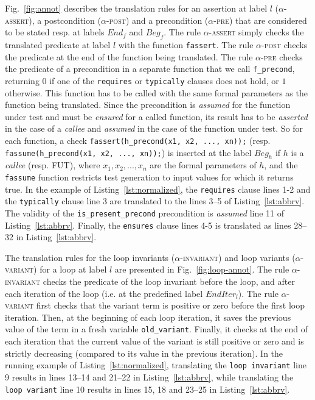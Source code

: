 Fig.~\ref{fig:annot} describes the translation rules for an assertion at label $l$
(\textsc{$\alpha$-assert}), a postcondition (\textsc{$\alpha$-post}) and
a precondition (\textsc{$\alpha$-pre})
that are considered to be stated resp. at labels $End_f$ and $Beg_f$. 
The rule \textsc{$\alpha$-assert}
simply checks the translated predicate at label $l$ with the function
\lstinline|fassert|. The rule \textsc{$\alpha$-post} checks the predicate at
the end of the function being translated. The rule \textsc{$\alpha$-pre} checks
the predicate of a precondition in a separate function that we call
\lstinline'f_precond', returning $0$ if one of the \lstinline|requires| or
\lstinline|typically| clauses does not hold, or $1$ otherwise. This function
has to be called with the same formal parameters as the function
being translated.
Since the precondition is \emph{assumed} for the function under test
and must be \emph{ensured} for a called function,
its result has to be {\em asserted} in the case
of a {\em callee}  and {\em assumed} in the case of the function under
test.
So for each function, a check 
\lstinline|fassert(h_precond(x1, x2, ..., xn));| (resp.
\lstinline|fassume(h_precond(x1, x2, ..., xn));|) is inserted at the label
$Beg_h$ if $h$ is a {\em callee} (resp. FUT), where
$x_1, x_2, ..., x_n$ are the formal parameters of $h$, and
the \lstinline|fassume| function restricts 
test generation to input values for which it returns true.
In the example of Listing~\ref{lst:normalized}, the
\lstinline|requires| clause lines 1-2 and the \lstinline|typically| clause line
3 are translated to the lines 3--5 of Listing~\ref{lst:abbrv}. The validity of the
\lstinline'is_present_precond' precondition is {\em assumed} line 11 of
Listing~\ref{lst:abbrv}. Finally, the \lstinline|ensures| clause lines 4-5 is
translated as lines 28--32 in Listing~\ref{lst:abbrv}. 

The translation rules for the loop invariants (\textsc{$\alpha$-invariant}) and
loop variants (\textsc{$\alpha$-variant}) for a loop at label $l$ are presented in
Fig.~\ref{fig:loop-annot}. The rule \textsc{$\alpha$-invariant} checks the
predicate of the loop invariant before the loop, and after
each iteration of the loop (i.e. at the predefined label $EndIter_l$). The rule
\textsc{$\alpha$-variant} first checks that the variant term is positive or zero
before the first loop iteration. Then, at the beginning of each loop iteration,
it saves the previous value of the term in a fresh variable 
\lstinline|old_variant|. Finally, it checks at the end of each iteration that
the current value of the variant is still positive or zero and is strictly
decreasing (compared to its value in the previous iteration).
In the running example of Listing~\ref{lst:normalized}, translating the
\lstinline|loop invariant| line 9 results in lines 13--14 and 21--22 in
Listing~\ref{lst:abbrv}, while translating the \lstinline|loop variant| line 10
results in lines 15, 18 and 23--25 in Listing~\ref{lst:abbrv}.


